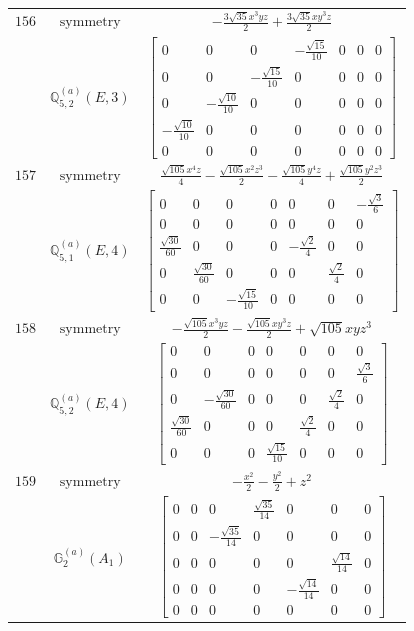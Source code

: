 \documentclass[fleqn,8pt,landscape]{jsarticle}
\begin{document}
\begin{longtable}{ccc}
$ 156 $ & $ \text{symmetry} $ & $ - \frac{3 \sqrt{35} x^{3} y z}{2} + \frac{3 \sqrt{35} x y^{3} z}{2} $ \\
$  $ & $ \mathbb{Q}_{5,2}^{(a)}(E,3) $ & $ \begin{bmatrix} 0 & 0 & 0 & - \frac{\sqrt{15}}{10} & 0 & 0 & 0 \\ 0 & 0 & - \frac{\sqrt{15}}{10} & 0 & 0 & 0 & 0 \\ 0 & - \frac{\sqrt{10}}{10} & 0 & 0 & 0 & 0 & 0 \\ - \frac{\sqrt{10}}{10} & 0 & 0 & 0 & 0 & 0 & 0 \\ 0 & 0 & 0 & 0 & 0 & 0 & 0 \end{bmatrix} $ \\ \hline
$ 157 $ & $ \text{symmetry} $ & $ \frac{\sqrt{105} x^{4} z}{4} - \frac{\sqrt{105} x^{2} z^{3}}{2} - \frac{\sqrt{105} y^{4} z}{4} + \frac{\sqrt{105} y^{2} z^{3}}{2} $ \\
$  $ & $ \mathbb{Q}_{5,1}^{(a)}(E,4) $ & $ \begin{bmatrix} 0 & 0 & 0 & 0 & 0 & 0 & - \frac{\sqrt{3}}{6} \\ 0 & 0 & 0 & 0 & 0 & 0 & 0 \\ \frac{\sqrt{30}}{60} & 0 & 0 & 0 & - \frac{\sqrt{2}}{4} & 0 & 0 \\ 0 & \frac{\sqrt{30}}{60} & 0 & 0 & 0 & \frac{\sqrt{2}}{4} & 0 \\ 0 & 0 & - \frac{\sqrt{15}}{10} & 0 & 0 & 0 & 0 \end{bmatrix} $ \\ \hline
$ 158 $ & $ \text{symmetry} $ & $ - \frac{\sqrt{105} x^{3} y z}{2} - \frac{\sqrt{105} x y^{3} z}{2} + \sqrt{105} x y z^{3} $ \\
$  $ & $ \mathbb{Q}_{5,2}^{(a)}(E,4) $ & $ \begin{bmatrix} 0 & 0 & 0 & 0 & 0 & 0 & 0 \\ 0 & 0 & 0 & 0 & 0 & 0 & \frac{\sqrt{3}}{6} \\ 0 & - \frac{\sqrt{30}}{60} & 0 & 0 & 0 & \frac{\sqrt{2}}{4} & 0 \\ \frac{\sqrt{30}}{60} & 0 & 0 & 0 & \frac{\sqrt{2}}{4} & 0 & 0 \\ 0 & 0 & 0 & \frac{\sqrt{15}}{10} & 0 & 0 & 0 \end{bmatrix} $ \\ \hline
$ 159 $ & $ \text{symmetry} $ & $ - \frac{x^{2}}{2} - \frac{y^{2}}{2} + z^{2} $ \\
$  $ & $ \mathbb{G}_{2}^{(a)}(A_{1}) $ & $ \begin{bmatrix} 0 & 0 & 0 & \frac{\sqrt{35}}{14} & 0 & 0 & 0 \\ 0 & 0 & - \frac{\sqrt{35}}{14} & 0 & 0 & 0 & 0 \\ 0 & 0 & 0 & 0 & 0 & \frac{\sqrt{14}}{14} & 0 \\ 0 & 0 & 0 & 0 & - \frac{\sqrt{14}}{14} & 0 & 0 \\ 0 & 0 & 0 & 0 & 0 & 0 & 0 \end{bmatrix} $ \\ \hline

\end{longtable}
\end{document}
